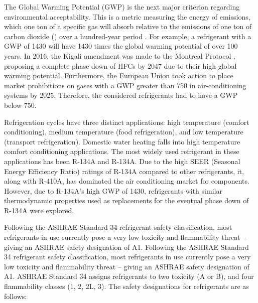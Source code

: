 \medskip
The Global Warming Potential (GWP) is the next major criterion regarding environmental acceptability. This is a metric measuring the energy of emissions, which one ton of a specific gas will absorb relative to the emissions of one ton of carbon dioxide () over a hundred-year period \cite{gwp}. For example, a refrigerant with a GWP of 1430 will have 1430 times the global warming potential of  over 100 years. In 2016, the Kigali amendment was made to the Montreal Protocol \cite{montreal_protocol}, proposing a complete phase down of HFCs by 2047 due to their high global warming potential. Furthermore, the European Union \cite{hfcs} took action to place market prohibitions on gases with a GWP greater than 750 in air-conditioning systems by 2025. Therefore, the considered refrigerants had to have a GWP below 750.

\medskip
Refrigeration cycles have three distinct applications: high temperature (comfort conditioning), medium temperature (food refrigeration), and low temperature (transport refrigeration). Domestic water heating falls into high temperature comfort conditioning applications. The most widely used refrigerant in these applications has been R-134A and R-134A. Due to the high SEER (Seasonal Energy Efficiency Ratio) ratings of R-134A compared to other refrigerants, it, along with R-410A, has dominated the air conditioning market for components. However, due to R-134A’s high GWP of 1430, refrigerants with similar thermodynamic properties used as replacements for the eventual phase down of R-134A were explored.

\newpage
Following the ASHRAE Standard 34 refrigerant safety classification, most refrigerants in use currently pose a very low toxicity and flammability threat – giving an ASHRAE safety designation of A1. Following the ASHRAE Standard 34 \cite{ashrae_safety} refrigerant safety classification, most refrigerants in use currently pose a very low toxicity and flammability threat – giving an ASHRAE safety designation of A1. ASHRAE Standard 34 assigns refrigerants to two toxicity (A or B), and four flammability classes (1, 2, 2L, 3). The safety designations for refrigerants are as follows:

